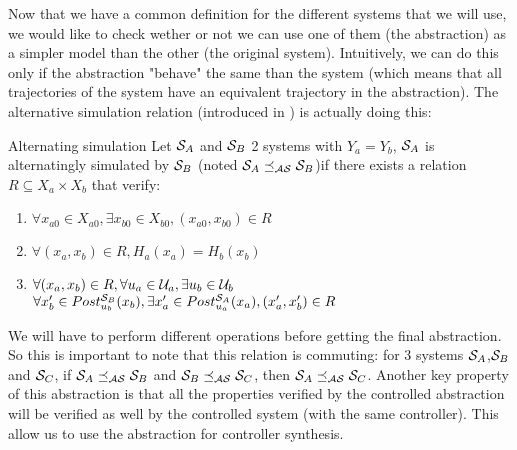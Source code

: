 Now that we have a common definition for the different systems that we will use, we would like to check wether or not we can use one of them (the abstraction) as a simpler model than the other (the original system).
Intuitively, we can do this only if the abstraction "behave" the same than the system (which means that all trajectories of the system have an equivalent trajectory in the abstraction).
The alternative simulation relation (introduced in \cite{tabuada2009verification}) is actually doing this:
\begin{nameddef}{Alternating simulation} \label{def_alt_sim}
Let $\mathcal{S}_A$ and $\mathcal{S}_B$ 2 systems with $Y_a=Y_b$, $\mathcal{S}_A$ is alternatingly simulated by $\mathcal{S}_B$ (noted $\mathcal{S}_A \preceq_{\mathcal{AS}} \mathcal{S}_B$)if there exists a relation $R \subseteq X_a \times X_b$ that verify:
\begin{enumerate}
\item $\forall x_{a0} \in X_{a0}, \exists x_{b0} \in X_{b0}, (x_{a0},x_{b0}) \in R$
\item $\forall (x_a,x_b) \in R, H_a(x_a) = H_b(x_b)$
\item $\forall (x_a,x_b) \in R, \forall u_{a} \in \mathcal{U}_{a}, \exists u_{b} \in \mathcal{U}_{b}$\\
$\forall x_b' \in Post_{u_b}^{\mathcal{S}_B}(x_b),\exists x_a' \in Post_{u_a}^{\mathcal{S}_A}(x_a), (x_a',x_b') \in R$
\popQED
\end{enumerate}
\end{nameddef}
We will have to perform different operations before getting the final abstraction.
So this is important to note that this relation is commuting: for 3 systems $\mathcal{S}_A$,$\mathcal{S}_B$ and $\mathcal{S}_C$, if $\mathcal{S}_A \preceq_{\mathcal{AS}} \mathcal{S}_B$ and $\mathcal{S}_B \preceq_{\mathcal{AS}} \mathcal{S}_C$, then $\mathcal{S}_A \preceq_{\mathcal{AS}} \mathcal{S}_C$.
Another key property of this abstraction is that all the properties verified by the controlled abstraction will be verified as well by the controlled system (with the same controller). This allow us to use the abstraction for controller synthesis.


